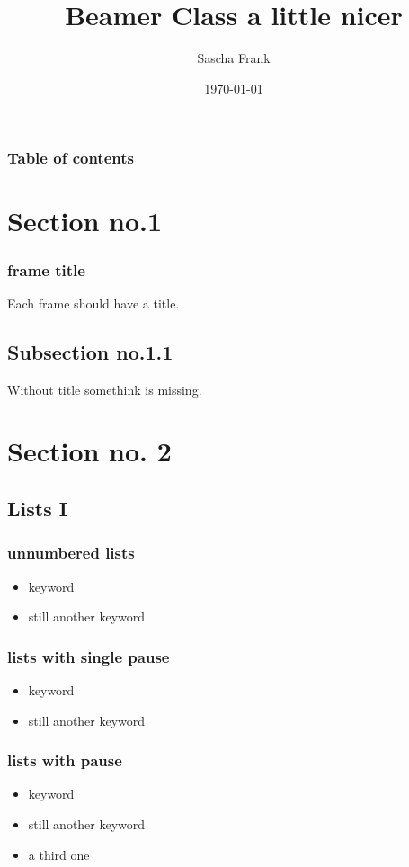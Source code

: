 \documentclass{beamer}
\title{Beamer Class a little nicer}
\author{Sascha Frank}
\date{\today}
\begin{document}
\begin{frame}
\titlepage
\end{frame} 

\begin{frame}
\frametitle{Table of contents}
\tableofcontents
\end{frame}
 


\section{Section no.1} 
\begin{frame}
\frametitle{frame title} 
Each frame should have a title.
\end{frame}

\subsection{Subsection no.1.1  }
\begin{frame}
Without title somethink is missing. 
\end{frame}


\section{Section no. 2} 
\subsection{Lists I}
\begin{frame}
\frametitle{unnumbered lists}
\begin{itemize}
\item keyword
\item still another keyword
\end{itemize} 
\end{frame}

\begin{frame}
\frametitle{lists with single pause}
\begin{itemize}
\item keyword  \pause 
\item still another keyword
\end{itemize} 
\end{frame}

\begin{frame}
\frametitle{lists with pause}
\begin{itemize}[<+->]
\item keyword  
\item still another keyword
\item a third one 
\end{itemize} 
\end{frame}
\end{document}

